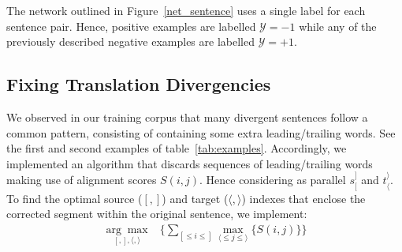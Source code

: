 \documentclass[11pt,a4paper]{article}
\begin{document}
The network outlined in Figure~\ref{net_sentence} uses a single label for each sentence pair. 
Hence, positive examples are labelled $\mathcal{Y}=-1$ while any of the previously described negative examples are labelled $\mathcal{Y}=+1$.

\subsection{Fixing Translation Divergencies}
\label{correction}

We observed in our training corpus that many divergent sentences follow a common pattern, consisting of containing some extra leading/trailing words. See the first and second examples of table~\ref{tab:examples}. 
Accordingly, we implemented an algorithm that discards sequences of leading/trailing words making use of alignment scores $S(i,j)$. 
Hence considering as parallel $s_[^]$ and $t_\langle^\rangle$. To find the optimal source ($[, ]$) and target ($\langle, \rangle$) indexes that enclose the corrected segment within the original sentence, we implement:
\begin{equation*}
\begin{split}
\underset{[, ], \langle, \rangle}{\arg\max}& \Big \{      \underset{[ \le i \le ]}{\sum} \underset{\langle \le j \le \rangle}{\max} \{ S(i,j) \}  \Big \} %
\end{split}
\end{equation*}
\end{document}
